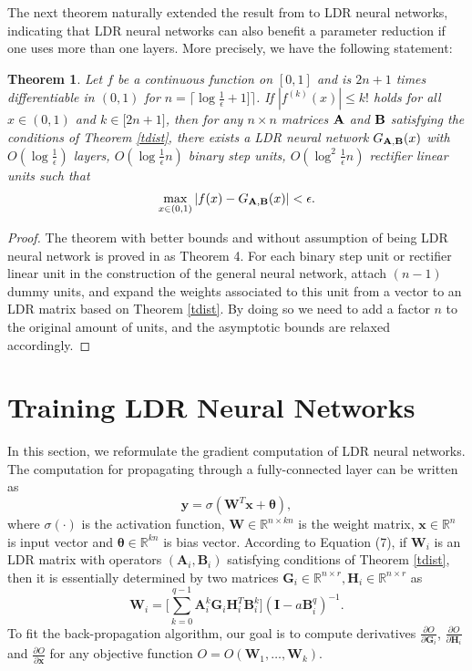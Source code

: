 \documentclass{article}
\newtheorem{theorem}{Theorem}[section]
\begin{document}
The next theorem naturally extended the result from \cite{liang2016deep} to LDR neural networks, indicating that LDR neural networks can also benefit a parameter reduction if one uses more than one layers. More precisely, we have the following statement:
\begin{theorem}
\label{tdeep}
Let $f$ be a continuous function on $[0,1]$ and is $2n+1$ times differentiable in $(0,1)$ for $n=\lceil\log\frac{1}{\epsilon}+1]\rceil$. If $|f^{(k)}(x)|\le k!$ holds for all $x\in (0,1)$ and $k\in \big[2n+1\big]$, then for any $n\times n$ matrices ${\bf A}$ and ${\bf B}$ satisfying the conditions of Theorem \ref{tdist}, there exists a LDR neural network $G_{{\bf A},{\bf B}}(x)$ with $O(\log\frac{1}{\epsilon})$ layers, $O(\log\frac{1}{\epsilon}n)$ binary step units, $O(\log^2\frac{1}{\epsilon}n)$ rectifier linear units such that
\begin{align*}
\max_{x\in (0,1)}|f(x) - G_{{\bf A},{\bf B}}(x)|<\epsilon.
\end{align*}
\end{theorem}
\begin{proof}
The theorem with better bounds and without assumption of being LDR neural network is proved in \cite{liang2016deep} as Theorem 4. For each binary step unit or rectifier linear unit in the construction of the general neural network, attach $(n-1)$ dummy units, and expand the weights associated to this unit from a vector to an LDR matrix based on Theorem \ref{tdist}. By doing so we need to add a factor $n$ to the original amount of units, and the asymptotic bounds are relaxed accordingly.
\end{proof}

\section{Training LDR Neural Networks}
\label{strain}
In this section, we reformulate the gradient computation of LDR neural networks. The computation for propagating through a fully-connected layer can be written as
\begin{equation}
\label{efc}
\mathbf{y} = \sigma(\mathbf{W}^T\mathbf{x} + \bm{\theta}),
\end{equation}
where $\sigma(\cdot)$ is the activation function, $\mathbf{W}\in\mathbb{R}^{n\times kn}$ is the weight matrix, $\mathbf{x}\in\mathbb{R}^{n}$ is input vector and $\bm{\theta}\in\mathbb{R}^{kn}$ is bias vector. According to Equation (7), if $\mathbf{W}_i$ is an LDR matrix with operators $(\mathbf{A}_i,\mathbf{B}_i)$ satisfying conditions of Theorem \ref{tdist}, then it is essentially determined by two matrices $\mathbf{G}_i\in\mathbb{R}^{n\times r}, \mathbf{H}_i\in\mathbb{R}^{n\times r}$ as
\begin{equation}
\mathbf{W}_i = \Big[\sum_{k=0}^{q-1}\mathbf{A}_i^k\mathbf{G}_i\mathbf{H}_i^T\mathbf{B}_i^k\Big](\mathbf{I} - a\mathbf{B}_i^q)^{-1}.
\end{equation}
To fit the back-propagation algorithm, our goal is to compute derivatives $\frac{\partial O}{\partial \mathbf{G}_i}$, $\frac{\partial O}{\partial \mathbf{H}_i}$ and $\frac{\partial O}{\partial \mathbf{x}}$ for any objective function $O = O(\mathbf{W}_1, \dots, \mathbf{W}_k)$.
\end{document}
